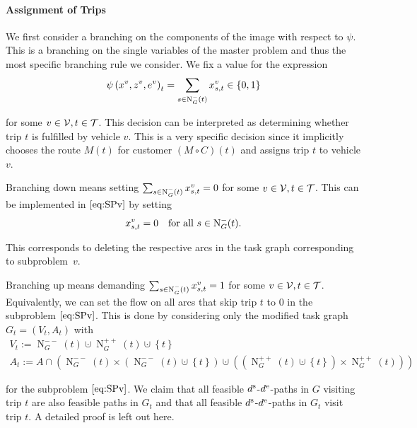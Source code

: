 \paragraph{Assignment of Trips} \parfill

We first consider a branching on the components of the image with respect to $\psi$. This is a branching on the single variables of the master problem and thus the most specific branching rule we consider. We fix a value for the expression
\begin{align*}
	\psi\left(x^v,z^v,e^v\right)_t = \sum_{s\in\operatorname{N}_G^-(t)} x^v_{s,t} \in\left\{0,1\right\}
\end{align*}

for some $v\in\mathcal{V}, t\in\mathcal{T}$. This decision can be interpreted as determining whether trip $t$ is fulfilled by vehicle $v$. This is a very specific decision since it implicitly chooses the route $M(t)$ for customer $(M\circ C)(t)$ and assigns trip $t$ to vehicle $v$.

Branching down means setting ${\sum_{s\in\operatorname{N}_G^-(t)} x^v_{s,t} = 0}$ for some $v\in\mathcal{V}, t\in\mathcal{T}$. This can be implemented in $\eqref{eq:SPv}$ by setting
\begin{align*}
	x^v_{s,t}=0 && \text{for all } s\in\operatorname{N}_G^-(t).
\end{align*}

This corresponds to deleting the respective arcs in the task graph corresponding to subproblem~$v$.

Branching up means demanding ${\sum_{s\in\operatorname{N}_G^-(t)} x^v_{s,t} = 1}$ for some $v\in\mathcal{V}, t\in\mathcal{T}$. Equivalently, we can set the flow on all arcs that skip trip $t$ to 0 in the subproblem $\eqref{eq:SPv}$. This is done by considering only the modified task graph ${G_t=\left(V_t,A_t\right)}$ with
\begin{gather*}
	V_t := \operatorname{N}^{--}_G(t)\cupdot\operatorname{N}^{++}_G(t)\cupdot\left\{t\right\} \\
	A_t := A \cap \left(\operatorname{N}^{--}_G(t)\times\left(\operatorname{N}^{--}_G(t)\cupdot\left\{t\right\}\right)\cupdot\left(\left(\operatorname{N}^{++}_G(t)\cupdot\left\{t\right\}\right)\times\operatorname{N}^{++}_G(t)\right)\right)
\end{gather*}

for the subproblem $\eqref{eq:SPv}$. We claim that all feasible $d^{\operatorname{s}}$-$d^{\operatorname{e}}$-paths in $G$ visiting trip $t$ are also feasible paths in $G_t$ and that all feasible $d^{\operatorname{s}}$-$d^{\operatorname{e}}$-paths in $G_t$ visit trip $t$. A detailed proof is left out here.

